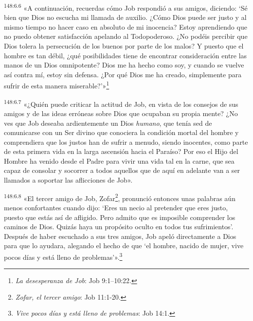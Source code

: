 \par 
\textsuperscript{148:6.6} «A continuación, recuerdas cómo Job respondió a sus amigos, diciendo: `Sé bien que Dios no escucha mi llamada de auxilio. ¿Cómo Dios puede ser justo y al mismo tiempo no hacer caso en absoluto de mi inocencia? Estoy aprendiendo que no puedo obtener satisfacción apelando al Todopoderoso. ¿No podéis percibir que Dios tolera la persecución de los buenos por parte de los malos? Y puesto que el hombre es tan débil, ¿qué posibilidades tiene de encontrar consideración entre las manos de un Dios omnipotente? Dios me ha hecho como soy, y cuando se vuelve así contra mí, estoy sin defensa. ¿Por qué Dios me ha creado, simplemente para sufrir de esta manera miserable?'»\footnote{\textit{La desesperanza de Job}: Job 9:1--10:22.}

\par 
\textsuperscript{148:6.7} «¿Quién puede criticar la actitud de Job, en vista de los consejos de sus amigos y de las ideas erróneas sobre Dios que ocupaban su propia mente? ¿No ves que Job deseaba ardientemente un Dios \textit{humano}, que tenía sed de comunicarse con un Ser divino que conociera la condición mortal del hombre y comprendiera que los justos han de sufrir a menudo, siendo inocentes, como parte de esta primera vida en la larga ascensión hacia el Paraíso? Por eso el Hijo del Hombre ha venido desde el Padre para vivir una vida tal en la carne, que sea capaz de consolar y socorrer a todos aquellos que de aquí en adelante van a ser llamados a soportar las aflicciones de Job».

\par 
\textsuperscript{148:6.8} «El tercer amigo de Job, Zofar\footnote{\textit{Zofar, el tercer amigo}: Job 11:1-20.}, pronunció entonces unas palabras aún menos confortantes cuando dijo: `Eres un necio al pretender que eres justo, puesto que estás así de afligido. Pero admito que es imposible comprender los caminos de Dios. Quizás haya un propósito oculto en todos tus sufrimientos'. Después de haber escuchado a sus tres amigos, Job apeló directamente a Dios para que lo ayudara, alegando el hecho de que `el hombre, nacido de mujer, vive pocos días y está lleno de problemas'».\footnote{\textit{Vive pocos días y está lleno de problemas}: Job 14:1.}

